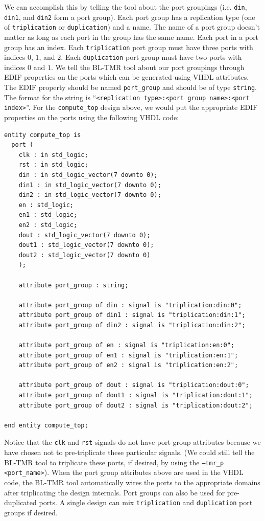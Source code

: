 We can accomplish this by telling the tool about the port groupings (i.e.
\texttt{din}, \texttt{din1}, and \texttt{din2} form a port group). Each port
group has a replication type (one of \texttt{triplication} or
\texttt{duplication}) and a name. The name of a port group doesn't matter as
long as each port in the group has the same name. Each port in a port group has
an index. Each \texttt{triplication} port group must have three ports with
indices $0$, $1$, and $2$. Each \texttt{duplication} port group must have two
ports with indices $0$ and $1$. We tell the BL-TMR tool about our port groupings
through EDIF properties on the ports which can be generated using VHDL
attributes. The EDIF property should be named \texttt{port\_group} and should
be of type \texttt{string}. The format for the string is ``\texttt{<replication
type>:<port group name>:<port index>}''. For the \texttt{compute\_top} design
above, we would put the appropriate EDIF properties on the ports using the
following VHDL code:
\begin{verbatim}
entity compute_top is
  port (
    clk : in std_logic;
    rst : in std_logic;
    din : in std_logic_vector(7 downto 0);
    din1 : in std_logic_vector(7 downto 0);
    din2 : in std_logic_vector(7 downto 0);
    en : std_logic;
    en1 : std_logic;
    en2 : std_logic;
    dout : std_logic_vector(7 downto 0);
    dout1 : std_logic_vector(7 downto 0);
    dout2 : std_logic_vector(7 downto 0)
    );
	
    attribute port_group : string;

    attribute port_group of din : signal is "triplication:din:0";
    attribute port_group of din1 : signal is "triplication:din:1";
    attribute port_group of din2 : signal is "triplication:din:2";

    attribute port_group of en : signal is "triplication:en:0";
    attribute port_group of en1 : signal is "triplication:en:1";
    attribute port_group of en2 : signal is "triplication:en:2";

    attribute port_group of dout : signal is "triplication:dout:0";
    attribute port_group of dout1 : signal is "triplication:dout:1";
    attribute port_group of dout2 : signal is "triplication:dout:2";

end entity compute_top;
\end{verbatim}

Notice that the \texttt{clk} and \texttt{rst} signals do not have port group
attributes because we have chosen not to pre-triplicate these particular
signals. (We could still tell the BL-TMR tool to triplicate these ports, if
desired, by using the \texttt{--tmr\_p <port\_name>}). When the port group attributes
above are used in the VHDL code, the BL-TMR tool automatically wires the ports
to the appropriate domains after triplicating the design internals. Port groups can
also be used for pre-duplicated ports. A single design can mix
\texttt{triplication} and \texttt{duplication} port groups if desired.

